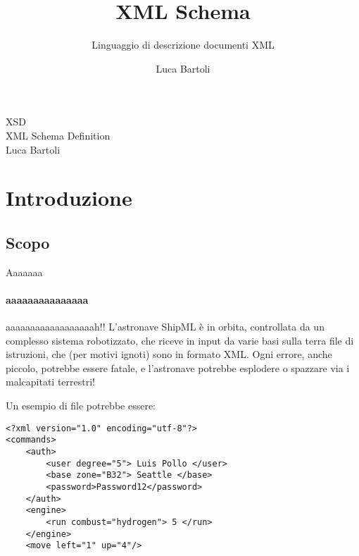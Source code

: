 \documentclass{beamer}
\title{XML Schema}
\subtitle{Linguaggio di descrizione documenti XML}
\author{Luca Bartoli}
\begin{document}
	\begin{darkframes}
	\begin{frame}
		
	\begin{center}
		\Huge{XSD}
		\\\bigskip
		\Large{XML Schema Definition}\\
		\large{Luca Bartoli}
		
	\end{center}			
	\end{frame}
	\end{darkframes}


    \section{Introduzione}
    
	\subsection{Scopo}
	\begin{frame}[containsverbatim]{Aaaaaaa}
		\framesubtitle{aaaaaaaaaaaaaaa}
	  	\begin{block}{aaaaaaaaaaaaaaaaaah!!}
        L'astronave \alert{ShipML} è in orbita, controllata da un complesso sistema robotizzato, che riceve in input da varie basi sulla terra file di istruzioni, che (per motivi ignoti) sono in formato XML. Ogni errore, anche piccolo, potrebbe essere fatale, e l'astronave potrebbe esplodere o spazzare via i malcapitati terrestri!
      \end{block}
      \end{frame}
      \begin{frame}[containsverbatim]

Un esempio di file potrebbe essere:      
      \bigskip
      \begin{lstlisting}
<?xml version="1.0" encoding="utf-8"?>
<commands>
    <auth>
        <user degree="5"> Luis Pollo </user>
        <base zone="B32"> Seattle </base>
        <password>Password12</password>
    </auth>
    <engine>
        <run combust="hydrogen"> 5 </run>
    </engine>
    <move left="1" up="4"/>
	\end{lstlisting}
	\end{frame}
	
\end{document}
